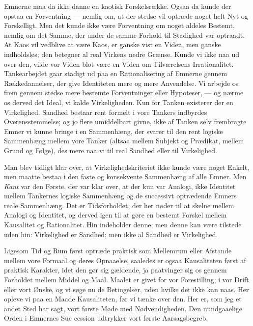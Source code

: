 \documentclass[12pt,a4paper]{book}
\newcommand{\opage}[1]{\marginnote{\footnotesize\textit{[#1]}}}
\newcommand{\apage}[1]{\marginnote{\footnotesize\textit{[#1]}}}
\begin{document}
Emnerne maa da ikke danne en kaotisk Forskelsrække. Ogsaa da kunde der opstaa en
Forventning --- nemlig om, at der stedse vil optræde noget helt Nyt og
Forskelligt. Men det kunde ikke være Forventning om noget aldeles Bestemt, \apage{209} nemlig
om det Samme, der under de samme Forhold til Stadighed var optraadt. At Kaos vil
vedblive at være Kaos, er ganske vist en Viden, men ganske indholdsløs; den
betegner al real Virkens nedre Grænse. Kunde vi ikke naa ud over den, vilde vor
Viden blot være en Viden om Tilværelsens Irrationalitet. Tankearbejdet gaar
stadigt ud paa en Rationalisering af Emnerne gennem Rækkedannelser, der give
Identiteten mere og mere Anvendelse. Vi arbejde os frem gennem stedse mere
bestemte Forventninger eller Hypoteser, --- og nærme os derved det Ideal, vi
kalde Virkeligheden. Kun for Tanken existerer der en Virkelighed. Sandhed bestaar
rent formelt i vore Tankers indbyrdes Overensstemmelse; og jo flere umiddelbart
givne, ikke af Tanken selv frembragte Emner vi kunne bringe i en Sammenhæng, der
svarer til den rent logiske Sammenhæng mellem vore Tanker (altsaa mellem Subjekt
og Prædikat, mellem Grund og Følge), des mere naa vi til real Sandhed eller til
Virkelighed.

Man blev tidligt klar over, at Virkelighedskriteriet ikke kunde være noget
Enkelt, men maatte bestaa i den faste og konsekvente Sammenhæng af alle Emner.
Men \emph{Kant} var den Første, der var klar over, at der kun var Analogi, ikke
Identitet mellem Tankernes logiske Sammenhæng og de successivt optrædende Emners
reale Sammenhæng. Det er Tidsforholdet, der her nøder til at skelne mellem
Analogi og Identitet, og derved igen til at gøre en bestemt Forskel mellem
Kausalitet og Rationalitet. Hin indeholder denne; men denne kan være tilstede
uden hin: Virkelighed er Sandhed; men ikke al Sandhed er Virkelighed.

Ligesom Tid og Rum først optræde praktisk som Mellemrum eller Afstande mellem
vore Formaal og deres Opnaaelse, saaledes er ogsaa Kausaliteten først af praktisk
Karakter, idet den gør sig gældende, ja paatvinger sig os gennem Forholdet mellem
Middel og Maal. Maalet er givet for vor Forestilling, i vor Drift eller vort
Ønske, og vi søge nu de Betingelser, uden hvilke det ikke kan naas. Her opleve vi
paa en Maade Kausaliteten, før vi tænke over den. Her er, som jeg et andet Sted
har sagt, vort første Møde med Nødvendigheden. Den uundgaaelige Orden i Emnernes
Suc%
\opage{210}cession udtrykker vort første Aarsagsbegreb.
\end{document}
